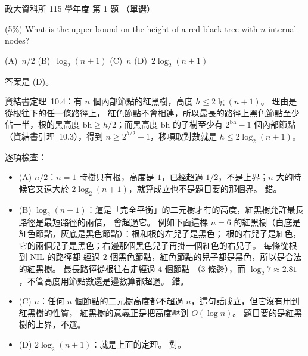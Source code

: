 \begin{pastexam}[label={px:nccu-115-dsa-01}]{政大資科所 115 學年度 第 1 題}
（單選）

(5\%) What is the upper bound on the height of a red-black tree with $n$ internal nodes?

(A)~$n/2$ \qquad (B)~$\log_2(n+1)$ \qquad (C)~$n$ \qquad (D)~$2\log_2(n+1)$
\end{pastexam}

\begin{pastsoln}
答案是 (D)。

資結書定理~10.4：有 $n$ 個內部節點的紅黑樹，高度 $h \le 2\lg(n+1)$。 理由是從根往下的任一條路徑上，
紅色節點不會相連，所以最長的路徑上黑色節點至少佔一半，根的黑高度 $\mathrm{bh} \ge h/2$；而黑高度
$\mathrm{bh}$ 的子樹至少有 $2^{\mathrm{bh}} - 1$ 個內部節點（資結書引理~10.3），得到
$n \ge 2^{h/2} - 1$，移項取對數就是 $h \le 2\log_2(n+1)$。

逐項檢查：
\begin{itemize}
\item (A) $n/2$：$n = 1$ 時樹只有根，高度是 $1$，已經超過 $1/2$，不是上界；$n$ 大的時候它又遠大於
$2\log_2(n+1)$，就算成立也不是題目要的那個界。 錯。
\item (B) $\log_2(n+1)$：這是「完全平衡」的二元樹才有的高度，紅黑樹允許最長路徑是最短路徑的兩倍，
會超過它。 例如下面這棵 $n = 6$ 的紅黑樹（白底是紅色節點，灰底是黑色節點）：根和根的左兒子是黑色；
根的右兒子是紅色，它的兩個兒子是黑色；右邊那個黑色兒子再掛一個紅色的右兒子。 每條從根到 NIL 的路徑都
經過 $2$ 個黑色節點，紅色節點的兒子都是黑色，所以是合法的紅黑樹。 最長路徑從根往右走經過 $4$ 個節點
（$3$ 條邊），而 $\log_2 7 \approx 2.81$，不管高度用節點數還是邊數算都超過。 錯。
\begin{center}
\end{center}
\item (C) $n$：任何 $n$ 個節點的二元樹高度都不超過 $n$，這句話成立，但它沒有用到紅黑樹的性質，
紅黑樹的意義正是把高度壓到 $O(\log n)$。 題目要的是紅黑樹的上界，不選。
\item (D) $2\log_2(n+1)$：就是上面的定理。 對。
\end{itemize}
\end{pastsoln}
